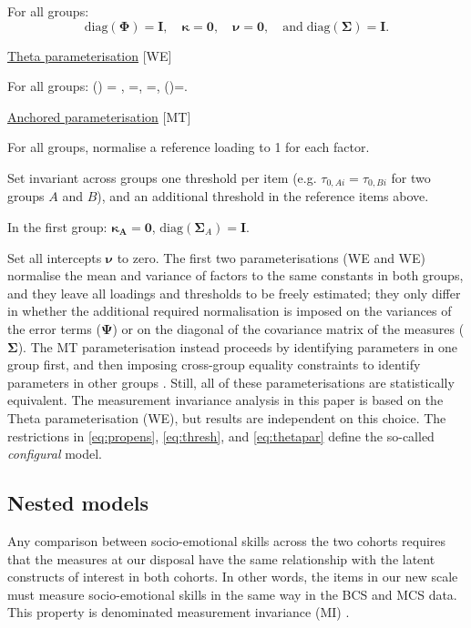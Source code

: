 For all groups: $$\text{diag}(\bm{\Phi}) = \bm{I}, \quad \bm{\kappa}=\bm{0}, \quad \bm{\nu}=\bm{0}, \quad \text{and} \; \text{diag}(\bm{\Sigma})=\bm{I}.$$

\item \underline{Theta parameterisation} {[WE{\textTheta}]} \citep{Wu2016a}

For all groups: 
\be\label{eq:thetapar}
(\bm{\Phi}) = , \quad \bm{\kappa}=, \quad \bm{\nu}=, \quad {} \; (\bm{\Psi})=.
\ee

\item \underline{Anchored parameterisation} {[MT]} \citep{Millsap2004}
  \bi
  \item For all groups, normalise a reference loading to 1 for each factor.
  \item Set invariant across groups one threshold per item (e.g. $\tau_{0,Ai} = \tau_{0,Bi}$ for two groups $A$ and $B$), and an additional threshold in the reference items above.
  \item In the first group: $\bm{\kappa_A}=\bm{0}$, $\text{diag}(\bm{\Sigma}_A)=\bm{I}$.
  \item Set all intercepts $\bm{\nu}$ to zero.
  \ei
\ei
The first two parameterisations (WE{\textDelta} and WE{\textTheta}) normalise the mean and variance of factors to the same constants in both groups, and they leave all loadings and thresholds to be freely estimated; they only differ in whether the additional required normalisation is imposed on the variances of the error terms ($\bm{\Psi}$) or on the diagonal of the covariance matrix of the measures ($\bm{\Sigma}$). The MT parameterisation instead proceeds by identifying parameters in one group first, and then imposing cross-group equality constraints to identify parameters in other groups \citep{Wu2016a}. Still, all of these parameterisations are statistically equivalent. The measurement invariance analysis in this paper is based on the Theta parameterisation (WE{\textTheta}), but results are independent on this choice. The restrictions in \eqref{eq:propens}, \eqref{eq:thresh}, and \eqref{eq:thetapar} define the so-called \emph{configural} model.

\subsection{Nested models \label{sec:nested}}

Any comparison between socio-emotional skills across the two cohorts requires that the measures at our disposal have the same relationship with the latent constructs of interest in both cohorts. In other words, the items in our new scale must measure socio-emotional skills in the same way in the BCS and MCS data. This property is denominated measurement invariance (MI) \citep{Vandenberg2000a,Putnick2016}.

